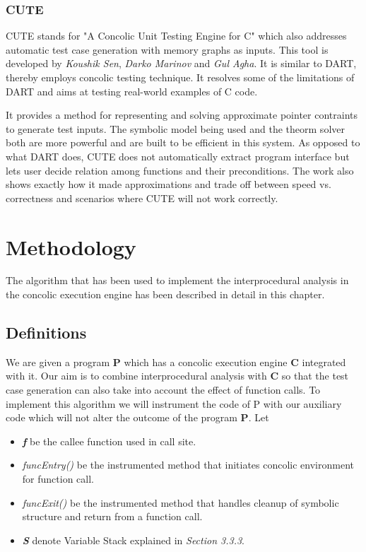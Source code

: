 \documentclass[12pt,oneside]{book}
\begin{document}
\newpage


\subsection{CUTE}
CUTE stands for "A Concolic Unit Testing Engine for C"\cite{cute} which also addresses automatic test case generation with memory graphs as inputs. This tool is developed by \textit{Koushik Sen}, \textit{Darko Marinov} and \textit{Gul Agha}. It is similar to DART, thereby employs concolic testing technique. It resolves some of the limitations of DART and aims at testing real-world examples of C code.

It provides a method for representing and solving approximate pointer contraints to generate test inputs. The symbolic model being used and the theorm solver both are more powerful and are built to be efficient in this system. As opposed to what DART does, CUTE does not automatically extract program interface but lets user decide relation among functions and their preconditions. The work also shows exactly how it made approximations and trade off between speed vs. correctness and scenarios where CUTE will not work correctly.






\newpage


\chapter{Methodology}
The algorithm that has been used to implement the interprocedural analysis in the concolic execution engine has been described in detail in this chapter.

\section{Definitions}

We are given a program \textbf{P} which has a concolic execution engine \textbf{C} integrated with it. Our aim is to combine interprocedural analysis with \textbf{C} so that the test case generation can also take into account the effect of function calls. To implement this algorithm we will instrument the code of P with our auxiliary code which will not alter the outcome of the program \textbf{P}. Let 

\begin{itemize}
\setlength\itemsep{0em}
  \item \textit{\textbf{f}} be the callee function used in call site.
 \item \textit{funcEntry()} be the instrumented method that initiates concolic environment for function call.
 \item \textit{funcExit()} be the instrumented method that handles cleanup of symbolic structure and return from a function call.
 \item \textit{\textbf{S}} denote Variable Stack explained in \textit{Section 3.3.3}.  
\end{itemize}
\end{document}

